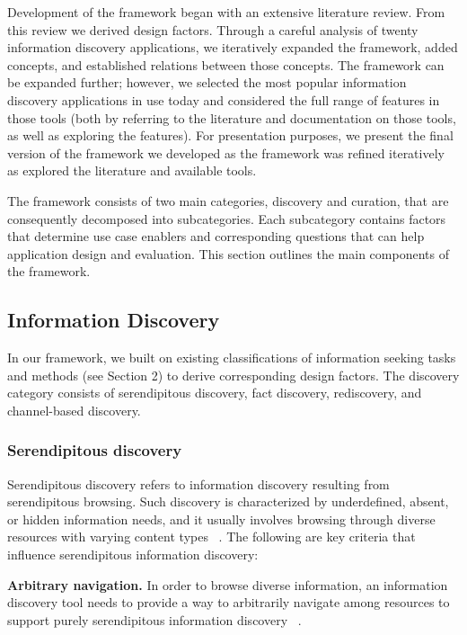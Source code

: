 \documentclass{casconpaper}
\begin{document}
{{Development of the framework began with an extensive literature review. From this review we derived design factors. Through a careful analysis of twenty information discovery applications, we iteratively expanded the framework, added concepts, and established relations between those concepts. The framework can be expanded further; however, we selected the most popular information discovery applications in use today   and considered the full range of features in those tools (both by referring to the literature and documentation on those tools, as well as exploring the features). For presentation purposes, we present the final version of the framework we developed as the framework was refined iteratively as explored the literature and available tools. 
 

The framework consists of two main categories, discovery and curation, that are consequently decomposed into subcategories. Each subcategory contains factors that determine use case enablers and corresponding questions that can help application design and evaluation. This section outlines the main components of the framework.

} %

{\subsection{Information Discovery}
In our framework, we built on existing classifications of information seeking tasks and methods (see Section 2) to derive corresponding design factors. The discovery category consists of serendipitous discovery, fact discovery, rediscovery, and channel-based discovery. 
} %

{\subsubsection{Serendipitous discovery}
Serendipitous discovery refers to information discovery resulting from serendipitous  browsing. Such discovery is characterized by underdefined, absent, or hidden information needs, and it usually involves browsing through diverse resources with varying content types ~\cite{kellar2006, kellar2007}. The following are key criteria that influence serendipitous information discovery:

\textbf{Arbitrary navigation.} In order to browse diverse information, an information discovery tool needs to provide a way to arbitrarily navigate among resources to support purely serendipitous information discovery ~\cite{foster}.

}}
\end{document}
